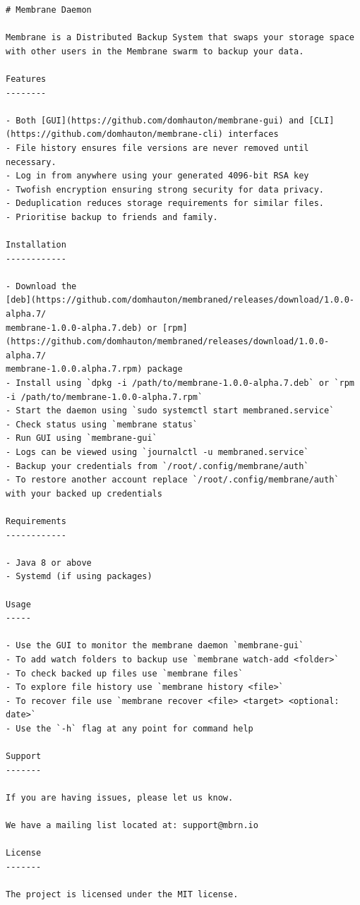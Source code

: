 \documentclass[11pt, a4paper, twoside]{report}
\begin{document}
\begin{lstlisting}[language=RsT, caption=Membrane README (\url{http://mbrn.io}), label=lst:readme]
# Membrane Daemon

Membrane is a Distributed Backup System that swaps your storage space with other users in the Membrane swarm to backup your data.

Features
--------

- Both [GUI](https://github.com/domhauton/membrane-gui) and [CLI](https://github.com/domhauton/membrane-cli) interfaces
- File history ensures file versions are never removed until necessary.
- Log in from anywhere using your generated 4096-bit RSA key
- Twofish encryption ensuring strong security for data privacy.
- Deduplication reduces storage requirements for similar files.
- Prioritise backup to friends and family.

Installation
------------

- Download the 
[deb](https://github.com/domhauton/membraned/releases/download/1.0.0-alpha.7/
membrane-1.0.0-alpha.7.deb) or [rpm](https://github.com/domhauton/membraned/releases/download/1.0.0-alpha.7/
membrane-1.0.0.alpha.7.rpm) package
- Install using `dpkg -i /path/to/membrane-1.0.0-alpha.7.deb` or `rpm -i /path/to/membrane-1.0.0-alpha.7.rpm`
- Start the daemon using `sudo systemctl start membraned.service`
- Check status using `membrane status`
- Run GUI using `membrane-gui`
- Logs can be viewed using `journalctl -u membraned.service`
- Backup your credentials from `/root/.config/membrane/auth`
- To restore another account replace `/root/.config/membrane/auth` with your backed up credentials

Requirements
------------

- Java 8 or above
- Systemd (if using packages)

Usage
-----

- Use the GUI to monitor the membrane daemon `membrane-gui`
- To add watch folders to backup use `membrane watch-add <folder>`
- To check backed up files use `membrane files`
- To explore file history use `membrane history <file>`
- To recover file use `membrane recover <file> <target> <optional: date>`
- Use the `-h` flag at any point for command help

Support
-------

If you are having issues, please let us know.

We have a mailing list located at: support@mbrn.io

License
-------

The project is licensed under the MIT license.
\end{lstlisting}
\end{document}
